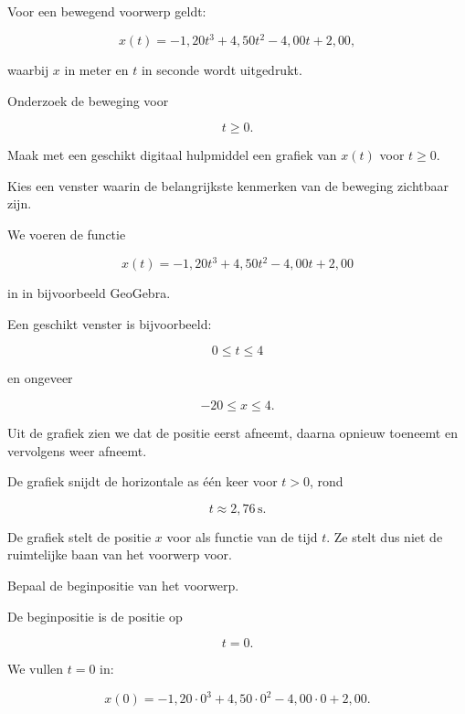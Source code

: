 \documentclass{ximera}
\begin{document}
\begin{oefening}{\oefU\ESS}

  Voor een bewegend voorwerp geldt:
  
  \[
  x(t)
  =
  -1{,}20t^3
  +4{,}50t^2
  -4{,}00t
  +2{,}00,
  \]
  
  waarbij $x$ in meter en $t$ in seconde wordt uitgedrukt.
  
  Onderzoek de beweging voor
  
  \[
  t\geq0.
  \]
  
  
  \begin{question}
  Maak met een geschikt digitaal hulpmiddel een grafiek van $x(t)$ voor
  $t\geq0$.
  
  Kies een venster waarin de belangrijkste kenmerken van de beweging zichtbaar
  zijn.
  
  \begin{oplossing}
  We voeren de functie
  
  \[
  x(t)
  =
  -1{,}20t^3
  +4{,}50t^2
  -4{,}00t
  +2{,}00
  \]
  
  in in bijvoorbeeld GeoGebra.
  
  Een geschikt venster is bijvoorbeeld:
  
  \[
  0\leq t\leq4
  \]
  
  en ongeveer
  
  \[
  -20\leq x\leq4.
  \]
  
  Uit de grafiek zien we dat de positie eerst afneemt, daarna opnieuw toeneemt
  en vervolgens weer afneemt.
  
  De grafiek snijdt de horizontale as één keer voor $t>0$, rond
  
  \[
  t\approx2{,}76\,\mathrm{s}.
  \]
  
  De grafiek stelt de positie $x$ voor als functie van de tijd $t$.
  Ze stelt dus niet de ruimtelijke baan van het voorwerp voor.
  \end{oplossing}
  \end{question}
  
  
  \begin{question}
  Bepaal de beginpositie van het voorwerp.
  
  \begin{oplossing}
  De beginpositie is de positie op
  
  \[
  t=0.
  \]
  
  We vullen $t=0$ in:
  
  \[
  x(0)
  =
  -1{,}20\cdot0^3
  +4{,}50\cdot0^2
  -4{,}00\cdot0
  +2{,}00.
  \]
  

\end{oplossing}
\end{question}
\end{oefening}
\end{document}
